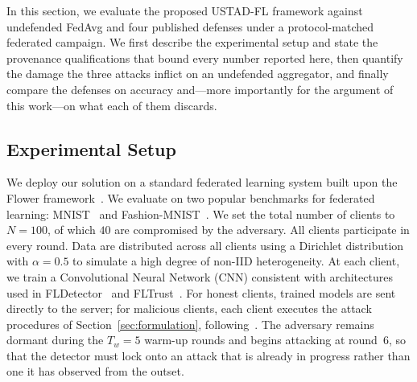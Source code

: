 \documentclass[journal]{IEEEtran}
\begin{document}
In this section, we evaluate the proposed USTAD-FL framework against undefended FedAvg and
four published defenses under a protocol-matched federated campaign. We first describe the
experimental setup and state the provenance qualifications that bound every number reported
here, then quantify the damage the three attacks inflict on an undefended aggregator, and
finally compare the defenses on accuracy and---more importantly for the argument of this
work---on what each of them discards.

\subsection{Experimental Setup}
\label{sec:experimental_setup}

We deploy our solution on a standard federated learning system built upon the Flower framework~\cite{beutel2020flower}. We evaluate on two popular benchmarks for federated learning: MNIST~\cite{lecun1998mnist} and Fashion-MNIST~\cite{xiao2017fashion}. We set the total number of clients to $N = 100$, of which $40$ are compromised by the adversary. All clients participate in every round. Data are distributed across all clients using a Dirichlet distribution with $\alpha = 0.5$ to simulate a high degree of non-IID heterogeneity. At each client, we train a Convolutional Neural Network (CNN) consistent with architectures used in FLDetector~\cite{zhang2022fldetector} and FLTrust~\cite{cao2020fltrust}. For honest clients, trained models are sent directly to the server; for malicious clients, each client executes the attack procedures of Section~\ref{sec:formulation}, following~\cite{baruch2019little, shejwalkar2021manipulating}. The adversary remains dormant during the $T_w = 5$ warm-up rounds and begins attacking at round~$6$, so that the detector must lock onto an attack that is already in progress rather than one it has observed from the outset.
\end{document}
